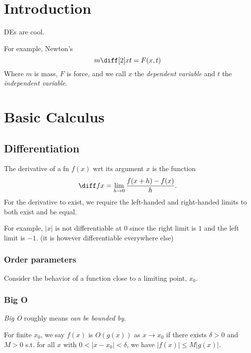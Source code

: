 \documentclass[12pt]{article}
\begin{document}

\setcounter{section}{-1}
\section{Introduction}

DEs are cool.

For example, Newton's
\[
    m \diff[2]xt = F(x,t)
\]
Where $m$ is mass, $F$ is force, and we call
$x$ the \emph{dependent variable} and $t$ the \emph{independent variable}.

\section{Basic Calculus}

\subsection{Differentiation}

\begin{definition}\label{def:derivative}

    The derivative of a fn $f(x)$ wrt its argument $x$ is
    the function
    \[
        \diff f x = \lim_{h\to 0}\frac{f(x+h) - f(x)}{h}.
    \]
    For the derivative to exist, we require the left-handed
    and right-handed limits to both exist and be equal.
\end{definition}

For example, $|x|$ is not differentiable at $0$ since
the right limit is $1$ and the left limit is $-1$.
(it is however differentiable everywhere else)

\subsubsection*{Order parameters}

Consider the behavior of a function close to a limiting point, $x_{0}$.

\subsubsection*{Big O}

\emph{Big O} roughly means \emph{can be bounded by}.

\begin{definition}
    For finite $x_{0}$, we say
    $f(x)$ is $O(g(x))$ as $x \to x_{0}$ if
    there exists $\delta >0$ and $M > 0$ s.t.
    for all $x$ with $0 < |x - x_{0}| < \delta $,
    we have $|f(x)| \le M|g(x)|$.
\end{definition}
\end{document}
